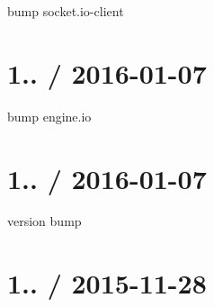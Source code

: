 \begin{DoxyItemize}
\item bump {\ttfamily socket.\+io-\/client}
\end{DoxyItemize}

\section*{1.. / 2016-\/01-\/07 }


\begin{DoxyItemize}
\item bump {\ttfamily engine.\+io}
\end{DoxyItemize}

\section*{1.. / 2016-\/01-\/07 }


\begin{DoxyItemize}
\item version bump
\end{DoxyItemize}

\section*{1.. / 2015-\/11-\/28 }


